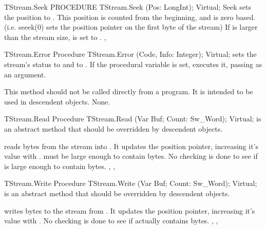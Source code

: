\begin{procedure}{TStream.Seek}
\Declaration      
PROCEDURE TStream.Seek (Pos: LongInt); Virtual;
\Description
Seek sets the position to . This position is counted
from the beginning, and is zero based. (i.e. seeek(0) sets the position
pointer on the first byte of the stream)
\Errors
If  is larger than the stream size,  is set to
.
\SeeAlso
{}, 
\end{procedure}

\begin{procedure}{TStream.Error}
\Declaration
Procedure TStream.Error (Code, Info: Integer); Virtual;
\Description
{} sets the stream's status to  and 
to . If the  procedural variable is set,
 executes it, passing  as an argument.

This method should not be called directly from a program. It is intended to
be used in descendent objects.
\Errors
None.
\SeeAlso
\end{procedure}

\begin{procedure}{TStream.Read}
\Declaration
Procedure TStream.Read (Var Buf; Count: Sw\_Word); Virtual;
\Description
{} is an abstract method that should be overridden by descendent
objects.

 reads  bytes from the stream into .
It updates the position pointer, increasing it's value with . 
 must be large enough to contain  bytes.
\Errors
No checking is done to see if  is large enough to contain
 bytes. 
\SeeAlso
{}, ,
\end{procedure}

\begin{procedure}{TStream.Write}
\Declaration
Procedure TStream.Write (Var Buf; Count: Sw\_Word); Virtual;
\Description
{} is an abstract method that should be overridden by descendent
objects.

 writes  bytes to the stream from .
It updates the position pointer, increasing it's value with . 
\Errors
No checking is done to see if  actually contains  bytes. 
\SeeAlso
{}, ,
\end{procedure}

